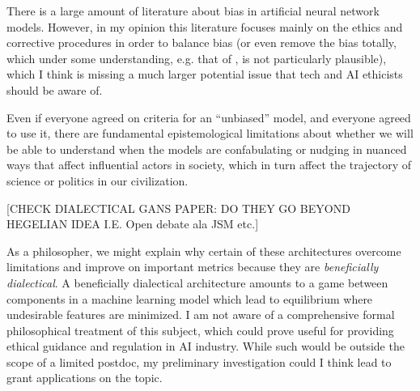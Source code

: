 \documentclass[11pt, oneside]{article}   	%
\begin{document}
There is a large amount of literature about bias in artificial neural network models.  However, in my opinion this literature focuses mainly on the ethics and corrective procedures in order to balance bias (or even remove the bias totally, which under some  understanding, e.g. that of \citep{Mitchell1980}, is not particularly plausible), which I think is missing a much larger potential issue that tech and AI ethicists should be aware of.  

Even if everyone agreed on criteria for an ``unbiased'' model, and everyone agreed to use it, there are fundamental epistemological limitations about whether we will be able to understand when the models are confabulating or nudging in nuanced ways that affect influential actors in society, which in turn affect the trajectory of science or politics in our civilization.


[CHECK DIALECTICAL GANS PAPER: DO THEY GO BEYOND HEGELIAN IDEA I.E. Open debate ala JSM etc.]


As a philosopher, we might explain why certain of these architectures overcome limitations and improve on important metrics because they are \emph{beneficially dialectical}.  A beneficially dialectical architecture amounts to a game between components in a machine learning model which lead to equilibrium where undesirable features are minimized.  I am not aware of a comprehensive formal philosophical treatment of this subject, which could prove useful for providing ethical guidance and regulation in AI industry.  While such would be outside the scope of a limited postdoc, my preliminary investigation could I think lead to grant applications on the topic.





\end{document}
